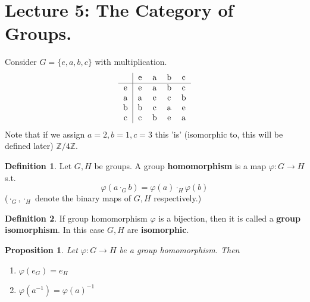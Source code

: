 \documentclass{article}
\newtheorem{theorem}{Proposition}[section]
\theoremstyle{definition}
\newtheorem{definition}{Definition}[section]
\theoremstyle{remark}
\begin{document}
\section{Lecture 5: The Category of Groups.}
Consider $G=\lbrace e,a,b,c\rbrace$ with multiplication.
\begin{equation}
	\begin{tabular}{c|cccc}
		~ & e & a & b & c \\
		\hline
		e & e & a & b & c \\
		a & a & e & c & b \\
		b & b & c & a & e \\
		c & c & b & e & a \\
	\end{tabular}
\end{equation}
Note that if we assign $a=2,b=1,c=3$ this 'is' (isomorphic to, this will be defined later) $\mathbb{Z}/4\mathbb{Z}$.\\
\begin{definition}
	\label{GroupHomomorphism}
	Let $G,H$ be groups. A group \textbf{homomorphism} is a map $\varphi:G\rightarrow H$ s.t.
	\begin{equation}
		\varphi(a\cdot_Gb)=\varphi (a)\cdot_H\varphi(b)
	\end{equation}
	($\cdot_G,\cdot_H$ denote the binary maps of $G,H$ respectively.)\\
\end{definition}
\begin{definition}
	If group homomorphism $\varphi$ is a bijection, then it is called a \textbf{group isomorphism}. In this case $G,H$ are \textbf{isomorphic}.\\
\end{definition}
\begin{theorem}
	Let $\varphi:G\rightarrow H$ be a group homomorphism. Then
	\begin{enumerate}
		\item $\varphi(e_G)=e_H$
		\item $\varphi(a^{-1})=\varphi(a)^{-1}$
	\end{enumerate}
\end{theorem}
\end{document}
